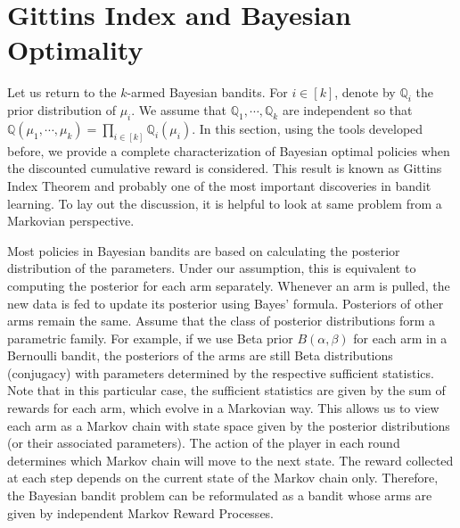 \documentclass[letterpaper,11pt,openright,openany]{book}
\numberwithin{equation}{section}
\theoremstyle{plain}
\theoremstyle{definition}
\def\Q{{\mathbb Q}}
\begin{document}
\section{Gittins Index and Bayesian Optimality}

Let us return to the $k$-armed Bayesian bandits. For $i\in [k]$, denote by $\Q_i$ the prior distribution of $\mu_i$. We assume that $\Q_1, \cdots, \Q_k$ are independent so that $\Q(\mu_1, \cdots, \mu_k)=\prod_{i\in [k]}\Q_i(\mu_i)$. In this section, using the tools developed before, we provide a complete characterization of Bayesian optimal policies when the discounted cumulative reward is considered. 
This result is known as Gittins Index Theorem and probably one of the most important discoveries in bandit learning. 
To lay out the discussion, it is helpful to look at same problem from a Markovian perspective. 

Most policies in Bayesian bandits are based on calculating the posterior distribution of the parameters. 
Under our assumption, this is equivalent to computing the posterior for each arm separately. 
Whenever an arm is pulled, the new data is fed to update its posterior using Bayes' formula. 
Posteriors of other arms remain the same.  
Assume that the class of posterior distributions form a parametric family. 
For example, if we use Beta prior $B(\alpha,\beta)$ for each arm in a Bernoulli bandit, the posteriors of the arms are still Beta distributions (conjugacy) with parameters determined by the respective sufficient statistics. 
Note that in this particular case, the sufficient statistics are given by the sum of rewards for each arm, which evolve in a Markovian way. 
This allows us to view each arm as a Markov chain with state space given by the posterior distributions (or their associated parameters). 
The action of the player in each round determines which Markov chain will move to the next state. 
The reward collected at each step depends on the current state of the Markov chain only.   
Therefore, the Bayesian bandit problem can be reformulated as a bandit whose arms are given by independent Markov Reward Processes.   
\end{document}
